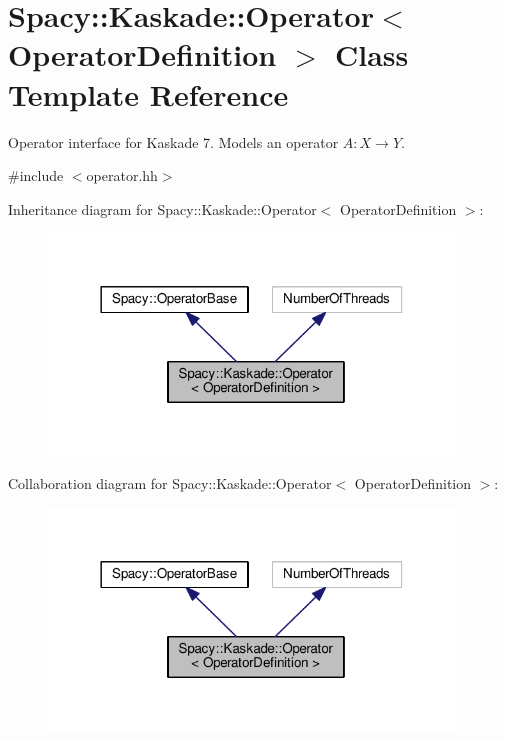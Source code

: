 \hypertarget{classSpacy_1_1Kaskade_1_1Operator}{}\section{Spacy\+:\+:Kaskade\+:\+:Operator$<$ Operator\+Definition $>$ Class Template Reference}
\label{classSpacy_1_1Kaskade_1_1Operator}


Operator interface for Kaskade 7. Models an operator $A:X\rightarrow Y$.  




{\ttfamily \#include $<$operator.\+hh$>$}



Inheritance diagram for Spacy\+:\+:Kaskade\+:\+:Operator$<$ Operator\+Definition $>$\+:
\nopagebreak
\begin{figure}[H]
\begin{center}
\leavevmode
\includegraphics[width=306pt]{classSpacy_1_1Kaskade_1_1Operator__inherit__graph}
\end{center}
\end{figure}


Collaboration diagram for Spacy\+:\+:Kaskade\+:\+:Operator$<$ Operator\+Definition $>$\+:
\nopagebreak
\begin{figure}[H]
\begin{center}
\leavevmode
\includegraphics[width=306pt]{classSpacy_1_1Kaskade_1_1Operator__coll__graph}
\end{center}
\end{figure}
